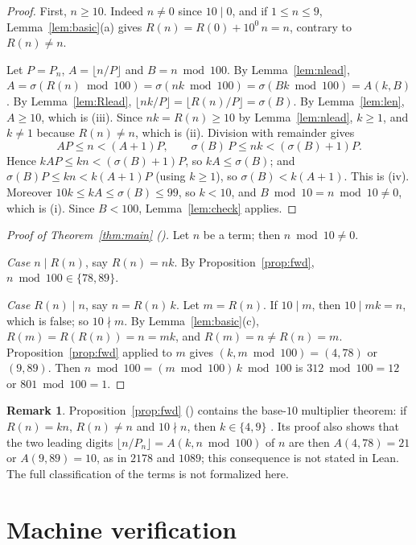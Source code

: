 \documentclass[11pt]{amsart}
\theoremstyle{plain}
\theoremstyle{definition}
\newtheorem{remark}[theorem]{Remark}
\newcommand{\sw}{\sigma}
\begin{document}
\begin{proof}
First, $n\ge10$. Indeed $n\ne0$ since $10\mid0$, and if $1\le n\le9$, Lemma~\ref{lem:basic}(a) gives $R(n)=R(0)+10^{0}\,n=n$, contrary to $R(n)\ne n$.

Let $P=P_n$, $A=\lfloor n/P\rfloor$ and $B=n\bmod100$. By Lemma~\ref{lem:nlead}, $A=\sw(R(n)\bmod100)=\sw(nk\bmod100)=\sw(Bk\bmod100)=A(k,B)$. By Lemma~\ref{lem:Rlead}, $\lfloor nk/P\rfloor=\lfloor R(n)/P\rfloor=\sw(B)$. By Lemma~\ref{lem:len}, $A\ge10$, which is (iii). Since $nk=R(n)\ge10$ by Lemma~\ref{lem:nlead}, $k\ge1$, and $k\ne1$ because $R(n)\ne n$, which is (ii). Division with remainder gives
\[
  AP\le n<(A+1)P,\qquad \sw(B)\,P\le nk<(\sw(B)+1)P .
\]
Hence $kAP\le kn<(\sw(B)+1)P$, so $kA\le\sw(B)$; and $\sw(B)P\le kn<k(A+1)P$ (using $k\ge1$), so $\sw(B)<k(A+1)$. This is (iv). Moreover $10k\le kA\le\sw(B)\le99$, so $k<10$, and $B\bmod10=n\bmod10\ne0$, which is (i). Since $B<100$, Lemma~\ref{lem:check} applies.
\end{proof}

\begin{proof}[Proof of Theorem~\ref{thm:main} ()]
Let $n$ be a term; then $n\bmod10\ne0$.

\emph{Case $n\mid R(n)$}, say $R(n)=nk$. By Proposition~\ref{prop:fwd}, $n\bmod100\in\{78,89\}$.

\emph{Case $R(n)\mid n$}, say $n=R(n)\,k$. Let $m=R(n)$. If $10\mid m$, then $10\mid mk=n$, which is false; so $10\nmid m$. By Lemma~\ref{lem:basic}(c), $R(m)=R(R(n))=n=mk$, and $R(m)=n\ne R(n)=m$. Proposition~\ref{prop:fwd} applied to $m$ gives $(k,m\bmod100)=(4,78)$ or $(9,89)$. Then $n\bmod100=(m\bmod100)\,k\bmod100$ is $312\bmod100=12$ or $801\bmod100=1$.
\end{proof}

\begin{remark}\label{rem:byproduct}
Proposition~\ref{prop:fwd} () contains the base-$10$ multiplier theorem: if $R(n)=kn$, $R(n)\ne n$ and $10\nmid n$, then $k\in\{4,9\}$ \cite{KS,Hoey}. Its proof also shows that the two leading digits $\lfloor n/P_n\rfloor=A(k,n\bmod100)$ of $n$ are then $A(4,78)=21$ or $A(9,89)=10$, as in $2178$ and $1089$; this consequence is not stated in Lean. The full classification of the terms is not formalized here.
\end{remark}

\section{Machine verification}\label{sec:lean}
\end{document}
